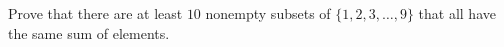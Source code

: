Prove that there are at least $10$ nonempty subsets of $\{1,2,3,\dots,9\}$ that all have the same sum of elements.
